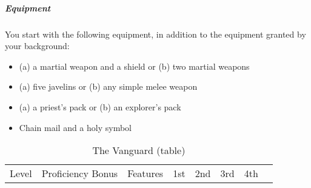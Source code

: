 \subparagraph{Equipment}\label{_equipment_3}

You start with the following equipment, in addition to the equipment
granted by your background:

\begin{itemize}
\item
  (a) a martial weapon and a shield or (b) two martial weapons
\item
  (a) five javelins or (b) any simple melee weapon
\item
  (a) a priest's pack or (b) an explorer's pack
\item
  Chain mail and a holy symbol
\end{itemize}

\begin{longtable}[]{@{}
  >{\raggedright\arraybackslash}p{}
  >{\raggedright\arraybackslash}p{}
  >{\raggedright\arraybackslash}p{}
  >{\raggedright\arraybackslash}p{}
  >{\raggedright\arraybackslash}p{}
  >{\raggedright\arraybackslash}p{}
  >{\raggedright\arraybackslash}p{}
  >{\raggedright\arraybackslash}p{}@{}}
\caption{The Vanguard (table)}\label{vanguard-table}\tabularnewline
\toprule\noalign{}
\begin{minipage}[b]{\linewidth}\raggedright
Level
\end{minipage} & \begin{minipage}[b]{\linewidth}\raggedright
Proficiency Bonus
\end{minipage} & \begin{minipage}[b]{\linewidth}\raggedright
Features
\end{minipage} & \begin{minipage}[b]{\linewidth}\centering
1st
\end{minipage} & \begin{minipage}[b]{\linewidth}\centering
2nd
\end{minipage} & \begin{minipage}[b]{\linewidth}\centering
3rd
\end{minipage} & \begin{minipage}[b]{\linewidth}\centering
4th
\end{minipage} & \begin{minipage}[b]{\linewidth}\centering

\end{minipage}
\end{longtable}
